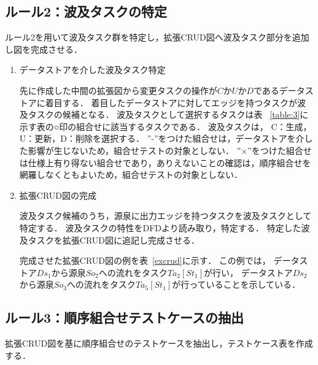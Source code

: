 \documentclass[a4paper,11pt]{jreport}
\begin{document}
\subsection{ルール2：波及タスクの特定}
ルール2を用いて波及タスク群を特定し，拡張CRUD図へ波及タスク部分を追加し図を完成させる．

\begin{enumerate}
\item データストアを介した波及タスク特定

先に作成した中間の拡張図から変更タスクの操作が$C$か$U$か$D$であるデータストアに着目する．
着目したデータストアに対してエッジを持つタスクが波及タスクの候補となる．
波及タスクとして選択するタスクは表 ~\ref{table:3}に示す表の○印の組合せに該当するタスクである．
波及タスクは， C：生成，U：更新，D：削除を選択する．
”-”をつけた組合せは，データストアを介した影響が生じないため，組合せテストの対象としない．
”×”をつけた組合せは仕様上有り得ない組合せであり，ありえないことの確認は，順序組合せを網羅しなくともよいため，組合せテストの対象としない．


\item 拡張CRUD図の完成

波及タスク候補のうち，源泉に出力エッジを持つタスクを波及タスクとして特定する．
波及タスクの特性をDFDより読み取り，特定する．
特定した波及タスクを拡張CRUD図に追記し完成させる．

完成させた拡張CRUD図の例を表~\ref{excrud}に示す．
この例では，
データストア$Ds_1$から源泉$So_2$への流れをタスク$Ta_2[St_1]$が行い，
データストア$Ds_2$から源泉$So_3$への流れをタスク$Ta_5[St_1]$が行っていることを示している．

\end{enumerate}

\subsection{ルール3：順序組合せテストケースの抽出}
拡張CRUD図を基に順序組合せのテストケースを抽出し，テストケース表を作成する．
\end{document}
